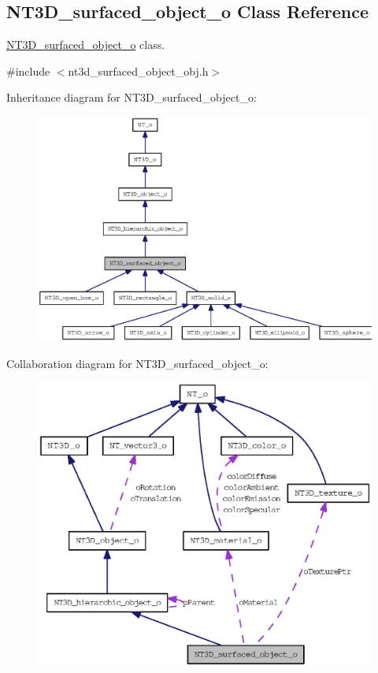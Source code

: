 \subsection{NT3D\_\-surfaced\_\-object\_\-o Class Reference}
\label{class_n_t3_d__surfaced__object__o}


\hyperlink{class_n_t3_d__surfaced__object__o}{NT3D\_\-surfaced\_\-object\_\-o} class.  




{\ttfamily \#include $<$nt3d\_\-surfaced\_\-object\_\-obj.h$>$}



Inheritance diagram for NT3D\_\-surfaced\_\-object\_\-o:
\nopagebreak
\begin{figure}[H]
\begin{center}
\leavevmode
\includegraphics[width=400pt]{class_n_t3_d__surfaced__object__o__inherit__graph}
\end{center}
\end{figure}


Collaboration diagram for NT3D\_\-surfaced\_\-object\_\-o:
\nopagebreak
\begin{figure}[H]
\begin{center}
\leavevmode
\includegraphics[width=400pt]{class_n_t3_d__surfaced__object__o__coll__graph}
\end{center}
\end{figure}
